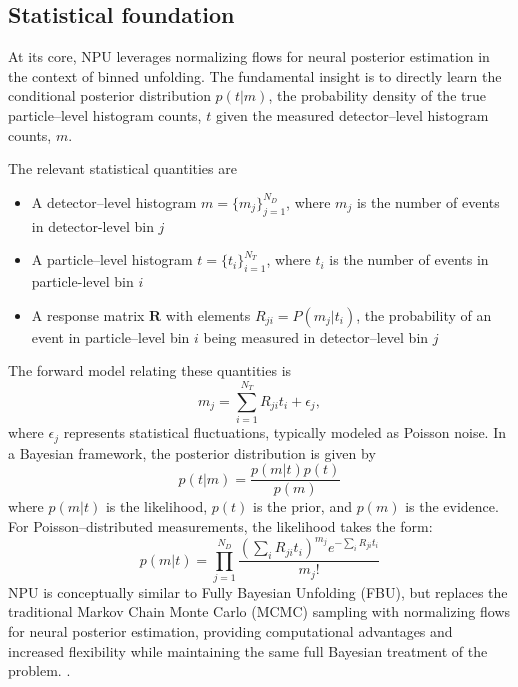 \subsection{Statistical foundation}
    At its core, NPU leverages normalizing flows for neural posterior estimation in the context of binned unfolding.
    The fundamental insight is to directly learn the conditional posterior distribution \(p(t|m)\), the probability density of the true particle--level histogram counts, $t$ given the measured detector--level histogram counts, $m$.

    The relevant statistical quantities are
    \begin{itemize}
    \item A detector--level histogram $m = \{m_j\}_{j=1}^{N_D}$, where $m_j$ is the number of events in detector-level bin $j$
    \item A particle--level histogram $t = \{t_i\}_{i=1}^{N_T}$, where $t_i$ is the number of events in particle-level bin $i$
    \item A response matrix $\mathbf{R}$ with elements $R_{ji} = P(m_j|t_i)$, the probability of an event in particle--level bin $i$ being measured in detector--level bin $j$
    \end{itemize}
    The forward model relating these quantities is
    \[
    m_j = \sum_{i=1}^{N_T} R_{ji} t_i + \epsilon_j,
    \]
    where $\epsilon_j$ represents statistical fluctuations, typically modeled as Poisson noise.
    In a Bayesian framework, the posterior distribution is given by
    \[
        p(t|m) = \frac{p(m|t)p(t)}{p(m)}
    \]
    where $p(m|t)$ is the likelihood, $p(t)$ is the prior, and $p(m)$ is the evidence.
    For Poisson--distributed measurements, the likelihood takes the form:
    \[
        p(m|t) = \prod_{j=1}^{N_D} \frac{(\sum_i R_{ji}t_i)^{m_j} e^{-\sum_i R_{ji}t_i}}{m_j!}
    \]
    NPU is conceptually similar to Fully Bayesian Unfolding (FBU), but replaces the traditional Markov Chain Monte Carlo (MCMC) sampling with normalizing flows for neural posterior estimation, providing computational advantages and increased flexibility while maintaining the same full Bayesian treatment of the problem. .
